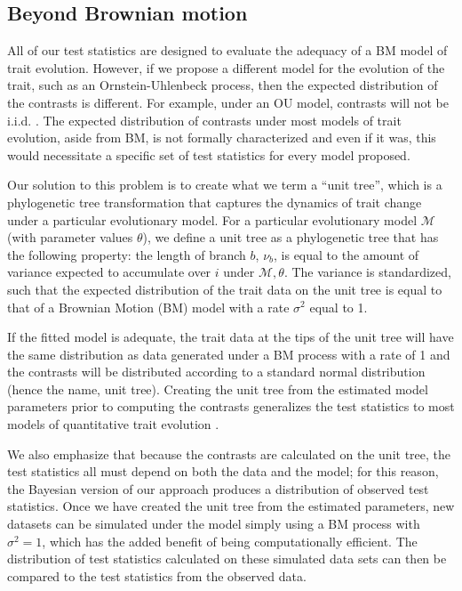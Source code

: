 \subsection*{Beyond Brownian motion}

All of our test statistics are designed to evaluate the adequacy of a BM model of trait evolution. However, if we propose a different model for the evolution of the trait, such as an Ornstein-Uhlenbeck \citep[OU;][]{Hansen1997} process, then the expected distribution of the contrasts is different. For example, under an OU model, contrasts will not be i.i.d. \citep{Hansen1997}. The expected distribution of contrasts under most models of trait evolution, aside from BM, is not formally characterized and even if it was, this would necessitate a specific set of test statistics for every model proposed.

Our solution to this problem is to create what we term a ``unit tree'', which is a phylogenetic tree transformation that captures the dynamics of trait change under a particular evolutionary model. For a particular evolutionary model $\mathcal{M}$ (with parameter values $\theta$), we define a unit tree as a phylogenetic tree that has the following property: the length of branch $b$, $\nu_b$, is equal to the amount of variance expected to accumulate over $i$ under $\mathcal{M}, \theta$. The variance is standardized, such that the expected distribution of the trait data on the unit tree is equal to that of a Brownian Motion (BM) model with a rate $\sigma^2$ equal to 1.

If the fitted model is adequate, the trait data at the tips of the unit tree will have the same distribution as data generated under a BM process with a rate of 1 and the contrasts will be distributed according to a standard normal distribution (hence the name, unit tree). Creating the unit tree from the estimated model parameters prior to computing the contrasts generalizes the test statistics to most models of quantitative trait evolution \citep[but see][for exceptions]{Landis2012, Landispreprint}. 

We also emphasize that because the contrasts are calculated on the unit tree, the test statistics all must depend on both the data and the model; for this reason, the Bayesian version of our approach produces a distribution of observed test statistics. Once we have created the unit tree from the estimated parameters, new datasets can be simulated under the model simply using a BM process with $\sigma^2 = 1$, which has the added benefit of being computationally efficient.  
The distribution of test statistics calculated on these simulated data sets can then be compared to the test statistics from the observed data. 

